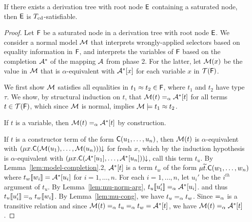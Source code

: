 \begin{lemma}%
\label{lem:ss}%
\afterDot
If there exists a derivation tree with root node $\mathsf{E}$ containing a saturated node, then $\mathsf{E}$ is $T_{\mathrm{cd}}$-satisfiable.
\end{lemma}
\begin{proof}
Let $\mathsf{F}$ be a saturated node in a derivation tree with root node $\mathsf{E}$.
We consider a normal model $\mathcal{M}$ 
that interprets wrongly-applied selectors based on equality information in $\mathsf{F}$,
and interprets the variables of $\mathsf{F}$ based on the completion $\mathcal{A}^\ast$ of the mapping $\mathcal{A}$ from phase 2.
For the latter, let $\mathcal{M}( x )$ be the value in $\mathcal{M}$ that is $\alpha$-equivalent with $\mathcal{A}^\ast [x]$ for each variable $x$ in $\mathcal{T}(\mathsf{F})$.

We first show $\mathcal{M}$ satisfies all equalities in $t_1 \approx t_2 \in \mathsf{F}$, where $t_1$ and $t_2$ have type $\tau$.
We show,
by structural induction on $t$,
that $\mathcal{M}( t ) \mathrel{=_\alpha} \mathcal{A}^\ast [t]$ for all terms $t \in \mathcal{T}( \mathsf{F} )$,
which since $\mathcal{M}$ is normal, implies $\mathcal{M} \models t_1 \approx t_2$.

If $t$ is a variable, then $\mathcal{M}( t ) \mathrel{=_\alpha} \mathcal{A}^\ast [ t ]$ by construction.

If $t$ is a constructor term of the form $\textsf{C}( u_1, \ldots, u_n )$, 
then $\mathcal{M}( t )$ is $\alpha$-equivalent with ${(\mu x. \textsf{C}( \mathcal{M}( u_1 ), \ldots, \mathcal{M}( u_n ) ) )}\!\!\downarrow$ for fresh $x$,
which by the induction hypothesis is $\alpha$-equivalent with ${(\mu x. \textsf{C}( \mathcal{A}^\ast [ u_1 ], \ldots, \mathcal{A}^\ast [ u_n ] ) )}\!\!\downarrow$, call this term $t_u$.
By Lemma~\ref{lem:model-completion}.2, $\mathcal{A}^\ast [t]$ is a term
$t_w$ of the form $\mu {\widetilde{t}}. \textsf{C}( w_1, \ldots, w_n )$
where $t_w[\![ w_i ]\!] = \mathcal{A}^\ast [u_i]$ for $i = 1, \ldots, n$.
For each $i = 1, \ldots, n$, let $u_i'$ be the $i^{th}$ argument of $t_u$.
By Lemma~\ref{lem:mu-norm-arg}, $t_u[\![ u_i' ]\!] \mathrel{=_\alpha} \mathcal{A}^\ast [u_i]$.
and thus $t_u[\![ u_i' ]\!] \mathrel{=_\alpha} t_w[\![  w_i  ]\!]$. %
By Lemma~\ref{lem:mu-cong}, we have $t_u \mathrel{=_\alpha} t_w$.
Since $\mathrel{=_\alpha}$ is a transitive relation and since $\mathcal{M}( t ) \mathrel{=_\alpha} t_u \mathrel{=_\alpha} t_w = \mathcal{A}^\ast [t]$,
we have $\mathcal{M}( t ) \mathrel{=_\alpha} \mathcal{A}^\ast [t]$.


\end{proof}
